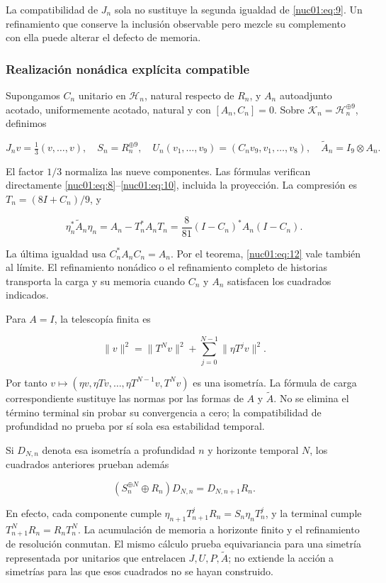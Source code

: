La compatibilidad de \(J_n\) sola no sustituye la segunda igualdad de \eqref{nuc01:eq:9}. Un refinamiento que conserve la inclusión observable pero mezcle su complemento con ella puede alterar el defecto de memoria.

\subsubsection{Realización nonádica explícita compatible}

Supongamos \(C_n\) unitario en \(\mathscr H_n\), natural respecto de \(R_n\), y \(A_n\) autoadjunto acotado, uniformemente acotado, natural y con \([A_n,C_n]=0\). Sobre \(\mathscr K_n=\mathscr H_n^{\oplus9}\), definimos

\[
J_nv=\tfrac13(v,\ldots,v),\quad
S_n=R_n^{\oplus9},\quad
U_n(v_1,\ldots,v_9)=(C_nv_9,v_1,\ldots,v_8),
\quad \widetilde A_n=I_9\otimes A_n.
\]

El factor \(1/3\) normaliza las nueve componentes. Las fórmulas verifican directamente \eqref{nuc01:eq:8}–\eqref{nuc01:eq:10}, incluida la proyección. La compresión es \(T_n=(8I+C_n)/9\), y

\begin{equation}
\eta_n^*\widetilde A_n\eta_n
=A_n-T_n^*A_nT_n
=\frac8{81}(I-C_n)^*A_n(I-C_n).
\label{nuc01:eq:12}
\end{equation}

La última igualdad usa \(C_n^*A_nC_n=A_n\). Por el teorema, \eqref{nuc01:eq:12} vale también al límite. El refinamiento nonádico o el refinamiento completo de historias transporta la carga y su memoria cuando \(C_n\) y \(A_n\) satisfacen los cuadrados indicados.

Para \(A=I\), la telescopía finita es

\[
\|v\|^2=\|T^Nv\|^2+\sum_{j=0}^{N-1}\|\eta T^jv\|^2.
\]

Por tanto \(v\mapsto(\eta v,\eta Tv,\ldots,\eta T^{N-1}v,T^Nv)\) es una isometría. La fórmula de carga correspondiente sustituye las normas por las formas de \(A\) y \(\widetilde A\). No se elimina el término terminal sin probar su convergencia a cero; la compatibilidad de profundidad no prueba por sí sola esa estabilidad temporal.

Si \(D_{N,n}\) denota esa isometría a profundidad \(n\) y horizonte temporal \(N\), los cuadrados anteriores prueban además

\[
(S_n^{\oplus N}\oplus R_n)D_{N,n}
=D_{N,n+1}R_n.
\]

En efecto, cada componente cumple \(\eta_{n+1}T_{n+1}^jR_n=S_n\eta_nT_n^j\), y la terminal cumple \(T_{n+1}^NR_n=R_nT_n^N\). La acumulación de memoria a horizonte finito y el refinamiento de resolución conmutan. El mismo cálculo prueba equivariancia para una simetría representada por unitarios que entrelacen \(J,U,P,\widetilde A\); no extiende la acción a simetrías para las que esos cuadrados no se hayan construido.
